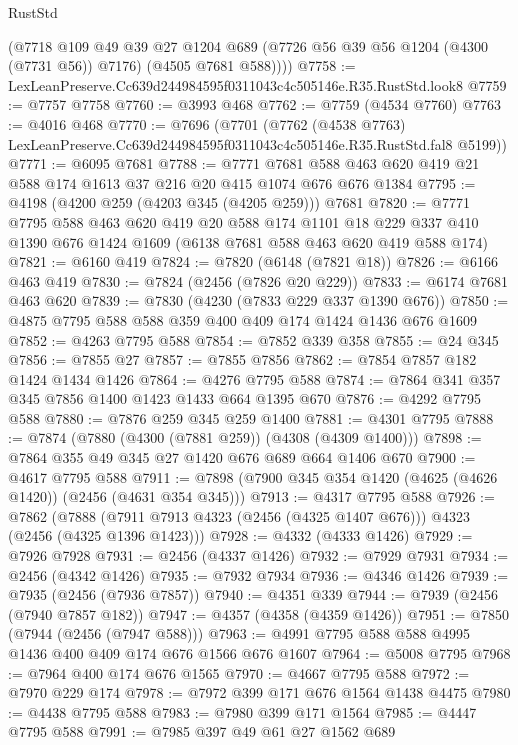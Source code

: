 \begin{lexlean}{RustStd}
\begin{coremodule}
        (@7718
          @109
          @49
          @39
          @27
          @1204
          @689
          (@7726 @56 @39 @56 @1204 (@4300 (@7731 @56)) @7176)
          (@4505 @7681 @588))))
@7758 := LexLeanPreserve.Cc639d244984595f0311043c4c505146e.R35.RustStd.look8
@7759 := @7757 @7758
@7760 := @3993 @468
@7762 := @7759 (@4534 @7760)
@7763 := @4016 @468
@7770 := @7696
    (@7701
      (@7762
        (@4538 @7763)
        LexLeanPreserve.Cc639d244984595f0311043c4c505146e.R35.RustStd.fal8
        @5199))
@7771 := @6095 @7681
@7788 := @7771 @7681 @588 @463 @620 @419 @21 @588 @174 @1613 @37 @216 @20 @415 @1074 @676 @676 @1384
@7795 := @4198 (@4200 @259 (@4203 @345 (@4205 @259))) @7681
@7820 := @7771
    @7795
    @588
    @463
    @620
    @419
    @20
    @588
    @174
    @1101
    @18
    @229
    @337
    @410
    @1390
    @676
    @1424
    @1609
    (@6138 @7681 @588 @463 @620 @419 @588 @174)
@7821 := @6160 @419
@7824 := @7820 (@6148 (@7821 @18))
@7826 := @6166 @463 @419
@7830 := @7824 (@2456 (@7826 @20 @229))
@7833 := @6174 @7681 @463 @620
@7839 := @7830 (@4230 (@7833 @229 @337 @1390 @676))
@7850 := @4875 @7795 @588 @588 @359 @400 @409 @174 @1424 @1436 @676 @1609
@7852 := @4263 @7795 @588
@7854 := @7852 @339 @358
@7855 := @24 @345
@7856 := @7855 @27
@7857 := @7855 @7856
@7862 := @7854 @7857 @182 @1424 @1434 @1426
@7864 := @4276 @7795 @588
@7874 := @7864 @341 @357 @345 @7856 @1400 @1423 @1433 @664 @1395 @670
@7876 := @4292 @7795 @588
@7880 := @7876 @259 @345 @259 @1400
@7881 := @4301 @7795
@7888 := @7874 (@7880 (@4300 (@7881 @259)) (@4308 (@4309 @1400)))
@7898 := @7864 @355 @49 @345 @27 @1420 @676 @689 @664 @1406 @670
@7900 := @4617 @7795 @588
@7911 := @7898 (@7900 @345 @354 @1420 (@4625 (@4626 @1420)) (@2456 (@4631 @354 @345)))
@7913 := @4317 @7795 @588
@7926 := @7862
    (@7888 (@7911 @7913 @4323 (@2456 (@4325 @1407 @676))) @4323 (@2456 (@4325 @1396 @1423)))
@7928 := @4332 (@4333 @1426)
@7929 := @7926 @7928
@7931 := @2456 (@4337 @1426)
@7932 := @7929 @7931
@7934 := @2456 (@4342 @1426)
@7935 := @7932 @7934
@7936 := @4346 @1426
@7939 := @7935 (@2456 (@7936 @7857))
@7940 := @4351 @339
@7944 := @7939 (@2456 (@7940 @7857 @182))
@7947 := @4357 (@4358 (@4359 @1426))
@7951 := @7850 (@7944 (@2456 (@7947 @588)))
@7963 := @4991 @7795 @588 @588 @4995 @1436 @400 @409 @174 @676 @1566 @676 @1607
@7964 := @5008 @7795
@7968 := @7964 @400 @174 @676 @1565
@7970 := @4667 @7795 @588
@7972 := @7970 @229 @174
@7978 := @7972 @399 @171 @676 @1564 @1438 @4475
@7980 := @4438 @7795 @588
@7983 := @7980 @399 @171 @1564
@7985 := @4447 @7795 @588
@7991 := @7985 @397 @49 @61 @27 @1562 @689

\end{coremodule}
\end{lexlean}
